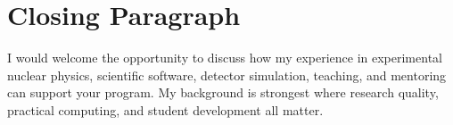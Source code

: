 \documentclass[11pt,letterpaper]{article}
\begin{document}
\section*{Closing Paragraph}
I would welcome the opportunity to discuss how my experience in experimental
nuclear physics, scientific software, detector simulation, teaching, and
mentoring can support your program. My background is strongest where research
quality, practical computing, and student development all matter.
\end{document}

